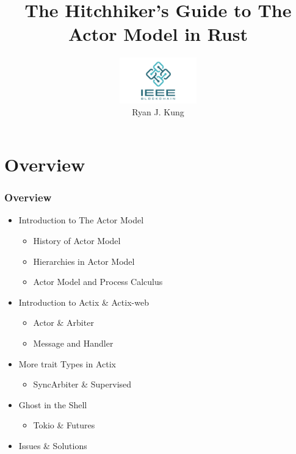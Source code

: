 \documentclass[notheorems, aspectratio=54]{beamer}
\title[Actor Model]{The Hitchhiker's Guide to The Actor Model in Rust}
\author[Ryan Kung]{\includegraphics[height=2cm]{./ieee-blockchain.png} \\ Ryan J. Kung}
\institute[IEEE Blockchain]{ryankung@ieee.org}
\begin{document}
\begin{frame}
    \titlepage
\end{frame}

\section{Overview}

\begin{frame}
  \frametitle{Overview}
  \begin{itemize}
  \item Introduction to The Actor Model
     \begin{itemize}
     \item History of Actor Model
     \item Hierarchies in Actor Model
     \item Actor Model and Process Calculus
     \end{itemize}
   \item Introduction to Actix \& Actix-web
     \begin{itemize}
     \item Actor \& Arbiter
     \item Message and Handler
    \end{itemize}
    \item More trait Types in Actix
    \begin{itemize}
      \item SyncArbiter \& Supervised
    \end{itemize}
    \item Ghost in the Shell
    \begin{itemize}
      \item Tokio \& Futures
    \end{itemize}
  \item Issues \& Solutions
\end{itemize}
\end{frame}
\end{document}
